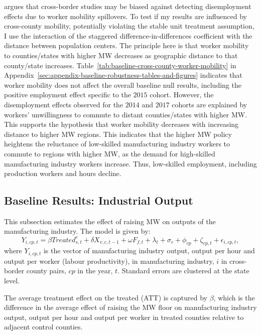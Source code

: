 \documentclass[authoryear, preprint, twocolumn, 1p]{elsarticle}
\begin{document}
    \citet{neumark2019econometrics} argues that cross-border studies may be biased against detecting disemployment effects due to worker mobility spillovers. To test if my results are influenced by cross-county mobility, potentially violating the stable unit treatment assumption, I use the interaction of the staggered difference-in-differences coefficient with the distance between population centers. The principle here is that worker mobility to counties/states with higher MW decreases as geographic distance to that county/state increases. Table~\ref{tab:baseline-cross-county-worker-mobility} in Appendix~\ref{sec:appendix-baseline-robustness-tables-and-figures} indicates that worker mobility does not affect the overall baseline null results, including the positive employment effect specific to the $2015$ cohort. However, the disemployment effects observed for the $2014$ and $2017$ cohorts are explained by workers' unwillingness to commute to distant counties/states with higher MW. This supports the hypothesis that worker mobility decreases with increasing distance to higher MW regions. This indicates that the higher MW policy heightens the reluctance of low-skilled manufacturing industry workers to commute to regions with higher MW, as the demand for high-skilled manufacturing industry workers increase. Thus, low-skilled employment, including production workers and hours decline.

    \subsection{Baseline Results: Industrial Output}\label{subsec:baseline-results-industrial-output}
    This subsection estimates the effect of raising MW on outputs of the manufacturing industry. The model is given by:
    \begin{equation}
        Y_{i,cp,t} = \beta Treated_{s,t}^e + \delta X_{v,c,t-1} + \omega F_{f,t} + \lambda_{t} + \sigma_{c} + \phi_{cp} + \zeta_{cp,t} + \epsilon_{i,cp,t},\label{eq:baseline-output}
    \end{equation}
    where $Y_{i,cp,t}$ is the vector of manufacturing industry output, output per hour and output per worker (labour productivity), in manufacturing industry, $i$ in cross-border county pairs, $cp$ in the year, $t$. Standard errors are clustered at the state level.
    

    The average treatment effect on the treated (ATT) is captured by $\beta$, which is the difference in the average effect of raising the MW floor on manufacturing industry output, output per hour and output per worker in treated counties relative to adjacent control counties.
\end{document}
